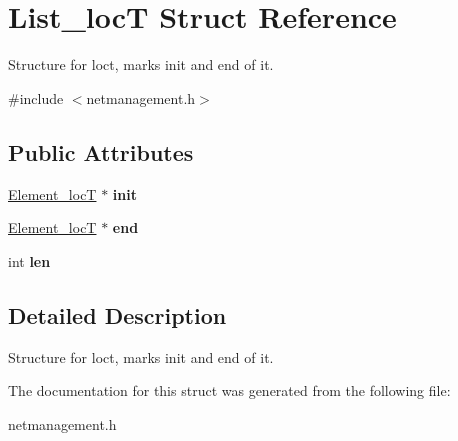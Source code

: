 \hypertarget{structList__locT}{\section{\-List\-\_\-loc\-T \-Struct \-Reference}
\label{structList__locT}
}


\-Structure for loct, marks init and end of it.  




{\ttfamily \#include $<$netmanagement.\-h$>$}

\subsection*{\-Public \-Attributes}
\begin{DoxyCompactItemize}
\item 
\hypertarget{structList__locT_a2c2ab23713c08c29821d49ec75b95925}{\hyperlink{structElementList__locT}{\-Element\-\_\-loc\-T} $\ast$ {\bfseries init}}\label{structList__locT_a2c2ab23713c08c29821d49ec75b95925}

\item 
\hypertarget{structList__locT_a85bf8795862ea0f9f3a9974c27ffc01b}{\hyperlink{structElementList__locT}{\-Element\-\_\-loc\-T} $\ast$ {\bfseries end}}\label{structList__locT_a85bf8795862ea0f9f3a9974c27ffc01b}

\item 
\hypertarget{structList__locT_a18d4caa65ac0c0b38b56bf19540ad6f4}{int {\bfseries len}}\label{structList__locT_a18d4caa65ac0c0b38b56bf19540ad6f4}

\end{DoxyCompactItemize}


\subsection{\-Detailed \-Description}
\-Structure for loct, marks init and end of it. 

\-The documentation for this struct was generated from the following file\-:\begin{DoxyCompactItemize}
\item 
netmanagement.\-h\end{DoxyCompactItemize}
